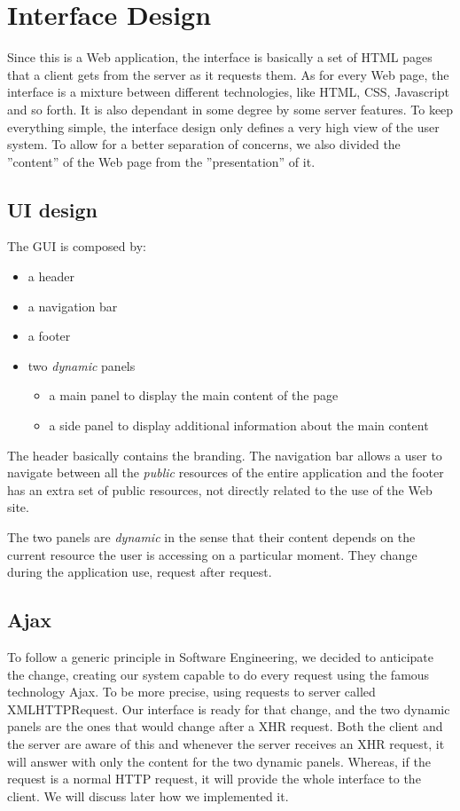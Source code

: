 \documentclass[12pt]{report}
\begin{document}
\section{Interface Design}
Since this is a Web application, the interface is basically a set of HTML pages that a client gets from the server as it requests them. As for every Web page, the interface is a mixture between different technologies, like HTML, CSS, Javascript and so forth. It is also dependant in some degree by some server features. To keep everything simple, the interface design only defines a very high view of the user system. To allow for a better separation of concerns, we also divided the ''content'' of the Web page from the ''presentation'' of it.
\subsection{UI design}
The GUI is composed by:
\begin{itemize}
\item a header
\item a navigation bar
\item a footer
\item two \emph{dynamic} panels
	\begin{itemize}
	\item a main panel to display the main content of the page
    \item a side panel to display additional information about the main content
	\end{itemize}
\end{itemize}
The header basically contains the branding. The navigation bar allows a user to navigate between all the \emph{public} resources of the entire application and the footer has an extra set of public resources, not directly related to the use of the Web site.

The two panels are \emph{dynamic} in the sense that their content depends on the current resource the user is accessing on a particular moment. They change during the application use, request after request.

\subsection{Ajax}
To follow a generic principle in Software Engineering, we decided to anticipate the change, creating our system capable to do every request using the famous technology Ajax. To be more precise, using requests to server called XMLHTTPRequest. Our interface is ready for that change, and the two dynamic panels are the ones that would change after a XHR request. Both the client and the server are aware of this and whenever the server receives an XHR request, it will answer with only the content for the two dynamic panels. Whereas, if the request is a normal HTTP request, it will provide the whole interface to the client. We will discuss later how we implemented it.
\end{document}
